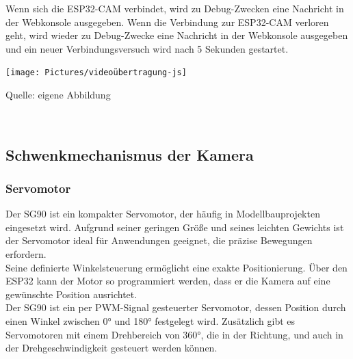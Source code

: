 \documentclass[ngerman,12pt,a4paper]{article}
\begin{document}
			Wenn sich die ESP32-CAM verbindet, wird zu Debug-Zwecken eine Nachricht in der Webkonsole ausgegeben. Wenn die Verbindung zur ESP32-CAM verloren geht, wird wieder zu Debug-Zwecke eine Nachricht in der Webkonsole ausgegeben und ein neuer Verbindungsversuch wird nach 5 Sekunden gestartet.
			\begin{center}
				\begin{minipage}[t]{\textwidth}
					\texttt{[image: Pictures/videoübertragung-js]}
					\label{fig:videoübertragung-js}
					\vspace{-10pt}
					\begin{center}
						\par\small Quelle: eigene Abbildung 
					\end{center}
				\end{minipage} \\[0.75cm]
			\end{center}
			\newpage \noindent
		\subsection{Schwenkmechanismus der Kamera}
				\subsubsection{Servomotor} %
				Der SG90 ist ein kompakter Servomotor, der häufig in Modellbauprojekten eingesetzt wird. Aufgrund seiner geringen Größe und seines leichten Gewichts ist der Servomotor ideal für Anwendungen geeignet, die präzise Bewegungen erfordern.\\
				Seine definierte Winkelsteuerung ermöglicht eine exakte Positionierung. Über den ESP32 kann der Motor so programmiert werden, dass er die Kamera auf eine gewünschte Position ausrichtet. \\
				Der SG90 ist ein per PWM-Signal gesteuerter Servomotor, dessen Position durch einen Winkel zwischen 0° und 180° festgelegt wird. Zusätzlich gibt es Servomotoren mit einem Drehbereich von 360°, die in der Richtung, und auch in der Drehgeschwindigkeit gesteuert werden können.
\end{document}
